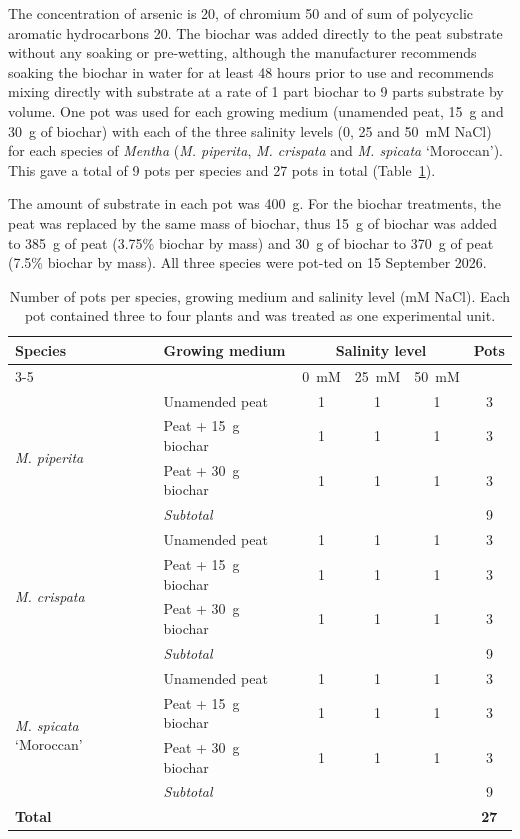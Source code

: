The concentration of arsenic is 20, of chromium 50 and of sum of polycyclic aromatic hydrocarbons 20. The biochar was added directly to the peat substrate without any soaking or pre-wetting, although the manufacturer recommends soaking the biochar in water for at least 48 hours prior to use and recommends mixing directly with substrate at a rate of 1 part biochar to 9 parts substrate by volume. One pot was used for each growing medium (unamended peat, 15~g and 30~g of biochar) with each of the three salinity levels (0, 25 and 50~mM NaCl) for each species of \textit{Mentha} (\textit{M. piperita}, \textit{M. crispata} and \textit{M. spicata} `Moroccan'). This gave a total of 9 pots per species and 27 pots in total (Table~\ref{tab:media}).

The amount of substrate in each pot was 400~g. For the biochar treatments, the peat was replaced by the same mass of biochar, thus 15~g of biochar was added to 385~g of peat (3.75\% biochar by mass) and 30~g of biochar to 370~g of peat (7.5\% biochar by mass). All three species were pot-ted on 15 September 2026.

\begin{table}[htbp]
  \centering
  \caption[Experimental design per species]{Number of pots per species, growing medium and salinity level (mM NaCl). Each pot contained three to four plants and was treated as one experimental unit.}
  \label{tab:media}
  \renewcommand{\arraystretch}{1.15}
  \begin{tabular}{llcccc}
    \toprule
    \multirow{2}{*}{Species} & \multirow{2}{*}{Growing medium} & \multicolumn{3}{c}{Salinity level} & \multirow{2}{*}{Pots} \\
    \cmidrule(lr){3-5}
    & & 0~mM & 25~mM & 50~mM & \\
    \midrule
    \multirow{4}{*}{\textit{M. piperita}}
      & Unamended peat      & 1 & 1 & 1 & 3 \\
      & Peat + 15~g biochar & 1 & 1 & 1 & 3 \\
      & Peat + 30~g biochar & 1 & 1 & 1 & 3 \\
    \cmidrule(l){2-6}
      & \textit{Subtotal}   &   &   &   & 9 \\
    \midrule
    \multirow{4}{*}{\textit{M. crispata}}
      & Unamended peat      & 1 & 1 & 1 & 3 \\
      & Peat + 15~g biochar & 1 & 1 & 1 & 3 \\
      & Peat + 30~g biochar & 1 & 1 & 1 & 3 \\
    \cmidrule(l){2-6}
      & \textit{Subtotal}   &   &   &   & 9 \\
    \midrule
    \multirow{4}{*}{\textit{M. spicata} `Moroccan'}
      & Unamended peat      & 1 & 1 & 1 & 3 \\
      & Peat + 15~g biochar & 1 & 1 & 1 & 3 \\
      & Peat + 30~g biochar & 1 & 1 & 1 & 3 \\
    \cmidrule(l){2-6}
      & \textit{Subtotal}   &   &   &   & 9 \\
    \midrule
    \multicolumn{5}{l}{\textbf{Total}} & \textbf{27} \\
    \bottomrule
  \end{tabular}
\end{table}

